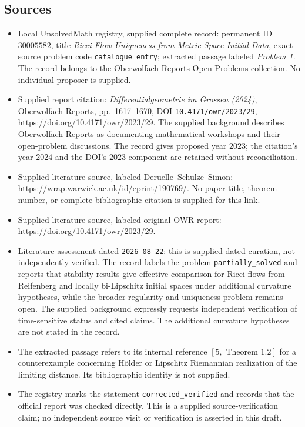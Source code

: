 \documentclass[11pt]{article}
\begin{document}
\subsection{Sources}
\begin{itemize}
\item Local UnsolvedMath registry, supplied complete record: permanent ID \(30005582\), title \emph{Ricci Flow Uniqueness from Metric Space Initial Data}, exact source problem code \texttt{catalogue entry}; extracted passage labeled \emph{Problem 1}. The record belongs to the Oberwolfach Reports Open Problems collection. No individual proposer is supplied.
\item Supplied report citation: \emph{Differentialgeometrie im Grossen (2024)}, Oberwolfach Reports, pp.\ 1617--1670, DOI \texttt{10.4171/owr/2023/29}, \url{https://doi.org/10.4171/owr/2023/29}. The supplied background describes Oberwolfach Reports as documenting mathematical workshops and their open-problem discussions. The record gives proposed year \(2023\); the citation's year \(2024\) and the DOI's \(2023\) component are retained without reconciliation.
\item Supplied literature source, labeled Deruelle--Schulze--Simon: \url{https://wrap.warwick.ac.uk/id/eprint/190769/}. No paper title, theorem number, or complete bibliographic citation is supplied for this link.
\item Supplied literature source, labeled original OWR report: \url{https://doi.org/10.4171/owr/2023/29}.
\item Literature assessment dated \texttt{2026-08-22}: this is supplied dated curation, not independently verified. The record labels the problem \texttt{partially\_solved} and reports that stability results give effective comparison for Ricci flows from Reifenberg and locally bi-Lipschitz initial spaces under additional curvature hypotheses, while the broader regularity-and-uniqueness problem remains open. The supplied background expressly requests independent verification of time-sensitive status and cited claims. The additional curvature hypotheses are not stated in the record.
\item The extracted passage refers to its internal reference \([5,\text{ Theorem }1.2]\) for a counterexample concerning H\"older or Lipschitz Riemannian realization of the limiting distance. Its bibliographic identity is not supplied.
\item The registry marks the statement \texttt{corrected\_verified} and records that the official report was checked directly. This is a supplied source-verification claim; no independent source visit or verification is asserted in this draft.
\end{itemize}
\end{document}

